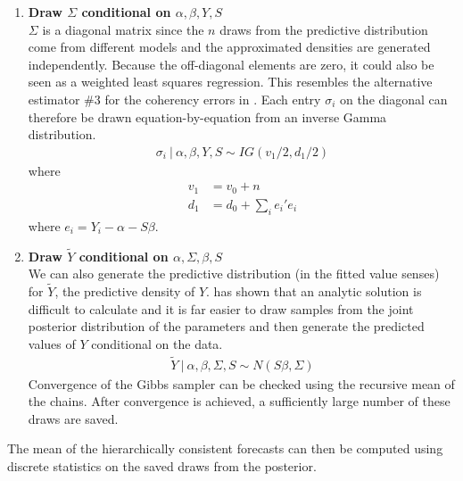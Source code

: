 \documentclass[a4paper,fleqn,11pt]{article}
\begin{document}
\begin{enumerate}
\item \textbf{Draw $\Sigma$ conditional on $\alpha,\beta,Y,S$}\\
$\Sigma$ is a diagonal matrix since the $n$ draws from the predictive distribution come from different models and the approximated densities are generated independently. Because the off-diagonal elements are zero, it could also be seen as a weighted least squares regression. This resembles the alternative estimator \#3 for the coherency errors in \cite{Wickramasuriya2015}. Each entry $\sigma_{i}$ on the diagonal can therefore be drawn equation-by-equation from an inverse Gamma distribution.
\begin{align}
\sigma_{i}\ |\ \alpha,\beta,Y,S \sim IG(v_1/2,d_1/2)
\end{align}
where
\begin{align*}
v_1 &= v_0 + n\\
d_1 &= d_0 + \sum_i e_i'e_i
\end{align*}
where $e_i = Y_i - \alpha - S \beta$.\\

\item \textbf{Draw $\tilde{Y}$ conditional on $\alpha,\Sigma,\beta,S$}\\
We can also generate the predictive distribution (in the fitted value senses) for $\tilde{Y}$, the predictive density of $Y$. \cite{Percy1992} has shown that an analytic solution is difficult to calculate and it is far easier to draw samples from the joint posterior distribution of the parameters and then generate the predicted values of $Y$ conditional on the data.
\begin{align}
\tilde{Y}\ |\ \alpha,\beta,\Sigma,S \sim N(S\beta,\Sigma)
\end{align}
Convergence of the Gibbs sampler can be checked using the recursive mean of the chains. After convergence is achieved, a sufficiently large number of these draws are saved.
\end{enumerate}

\noindent The mean of the hierarchically consistent forecasts can then be computed using discrete statistics on the saved draws from the posterior.\\
\end{document}
